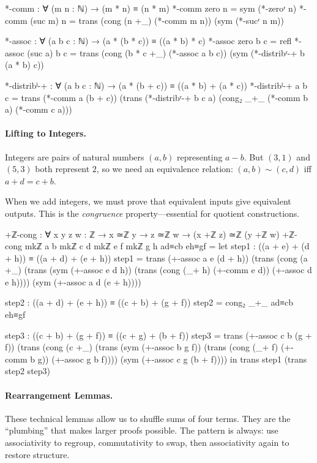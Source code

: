 \documentclass[11pt,a4paper]{book}
\begin{document}
\begin{code}
*-comm : ∀ (m n : ℕ) → (m * n) ≡ (n * m)
*-comm zero    n = sym (*-zeroʳ n)
*-comm (suc m) n = trans (cong (n +_) (*-comm m n)) (sym (*-sucʳ n m))

*-assoc : ∀ (a b c : ℕ) → (a * (b * c)) ≡ ((a * b) * c)
*-assoc zero b c = refl
*-assoc (suc a) b c = 
  trans (cong (b * c +_) (*-assoc a b c)) (sym (*-distribʳ-+ b (a * b) c))

*-distribˡ-+ : ∀ (a b c : ℕ) → (a * (b + c)) ≡ ((a * b) + (a * c))
*-distribˡ-+ a b c = 
  trans (*-comm a (b + c))
        (trans (*-distribʳ-+ b c a)
               (cong₂ _+_ (*-comm b a) (*-comm c a)))
\end{code}

\paragraph{Lifting to Integers.}
Integers are pairs of natural numbers $(a, b)$ representing $a - b$. But $(3, 1)$ and $(5, 3)$ 
both represent $2$, so we need an equivalence relation: $(a, b) \sim (c, d)$ iff $a + d = c + b$.

When we add integers, we must prove that equivalent inputs give equivalent outputs. This is 
the \emph{congruence} property---essential for quotient constructions.

\begin{code}
+ℤ-cong : ∀ {x y z w : ℤ} → x ≃ℤ y → z ≃ℤ w → (x +ℤ z) ≃ℤ (y +ℤ w)
+ℤ-cong {mkℤ a b} {mkℤ c d} {mkℤ e f} {mkℤ g h} ad≡cb eh≡gf =
  let
    step1 : ((a + e) + (d + h)) ≡ ((a + d) + (e + h))
    step1 = trans (+-assoc a e (d + h)) 
            (trans (cong (a +_) (trans (sym (+-assoc e d h)) 
                   (trans (cong (_+ h) (+-comm e d)) (+-assoc d e h))))
            (sym (+-assoc a d (e + h))))
    
    step2 : ((a + d) + (e + h)) ≡ ((c + b) + (g + f))
    step2 = cong₂ _+_ ad≡cb eh≡gf
    
    step3 : ((c + b) + (g + f)) ≡ ((c + g) + (b + f))
    step3 = trans (+-assoc c b (g + f))
            (trans (cong (c +_) (trans (sym (+-assoc b g f))
                   (trans (cong (_+ f) (+-comm b g)) (+-assoc g b f))))
            (sym (+-assoc c g (b + f))))
  in trans step1 (trans step2 step3)
\end{code}

\paragraph{Rearrangement Lemmas.}
These technical lemmas allow us to shuffle sums of four terms. They are the ``plumbing'' that 
makes larger proofs possible. The pattern is always: use associativity to regroup, commutativity 
to swap, then associativity again to restore structure.
\end{document}

